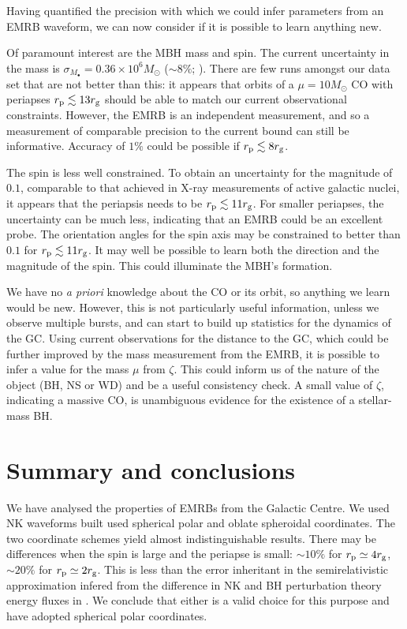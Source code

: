 Having quantified the precision with which we could infer parameters from an EMRB waveform, we can now consider if it is possible to learn anything new.

Of paramount interest are the MBH mass and spin. The current uncertainty in the mass is $\sigma_{M_\bullet} = 0.36 \times 10^6 M_\odot$ ($\sim 8\%$; \citealt{Gillessen2009}). There are few runs amongst our data set that are not better than this: it appears that orbits of a $\mu = 10 M_\odot$ CO with periapses $r_\mathrm{p} \lesssim 13 r_\mathrm{g}$ should be able to match our current observational constraints. However, the EMRB is an independent measurement, and so a measurement of comparable precision to the current bound can still be informative. Accuracy of $1\%$ could be possible if $r_\mathrm{p} \lesssim 8 r_\mathrm{g}$.

The spin is less well constrained. To obtain an uncertainty for the magnitude of $0.1$, comparable to that achieved in X-ray measurements of active galactic nuclei, it appears that the periapsis needs to be $r_\mathrm{p} \lesssim 11 r_\mathrm{g}$. For smaller periapses, the uncertainty can be much less, indicating that an EMRB could be an excellent probe. The orientation angles for the spin axis may be constrained to better than $0.1$ for $r_\mathrm{p} \lesssim 11 r_\mathrm{g}$. It may well be possible to learn both the direction and the magnitude of the spin. This could illuminate the MBH's formation.

We have no {\it a priori} knowledge about the CO or its orbit, so anything we learn would be new. However, this is not particularly useful information, unless we observe multiple bursts, and can start to build up statistics for the dynamics of the GC. Using current observations for the distance to the GC, which could be further improved by the mass measurement from the EMRB, it is possible to infer a value for the mass $\mu$ from $\zeta$. This could inform us of the nature of the object (BH, NS or WD) and be a useful consistency check. A small value of $\zeta$, indicating a massive CO, is unambiguous evidence for the existence of a stellar-mass BH.

\section{Summary and conclusions}

We have analysed the properties of EMRBs from the Galactic Centre. We used NK waveforms built used spherical polar and oblate spheroidal coordinates. The two coordinate schemes yield almost indistinguishable results. There may be differences when the spin is large and the periapse is small: $\sim 10\%$ for $r_\mathrm{p} \simeq 4 r_\mathrm{g}$, $\sim 20\%$ for $r_\mathrm{p} \simeq 2 r_\mathrm{g}$. This is less than the error inheritant in the semirelativistic approximation infered from the difference in NK and BH perturbation theory energy fluxes in . We conclude that either is a valid choice for this purpose and have adopted spherical polar coordinates.

